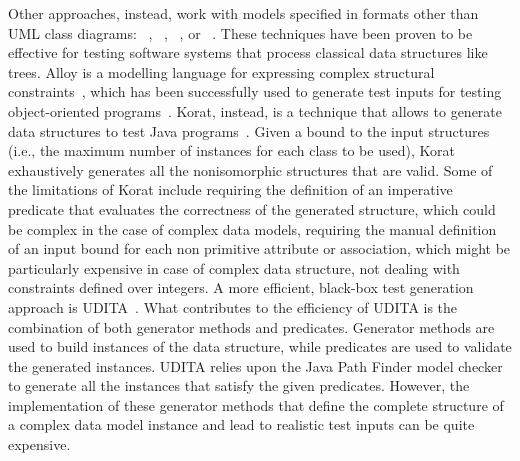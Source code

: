 Other approaches, instead, work with models specified in formats other than UML class diagrams:
~\cite{Boyapati-KORAT-ISSTA-2002,gligoric2010test}, ~\cite{Senni-CPLgeneration-TAP-2012}, ~\cite{Khurshid-SpecificationBasedTesting-ASE-2004}, or ~\cite{Horcher-Z-1995}.
These techniques have been proven to be effective for testing software systems that process classical data structures like trees. 
Alloy is a modelling language for expressing complex structural constraints~\cite{Jackson:Alloy:2002},
which has been successfully used to generate test inputs for testing object-oriented programs~\cite{Khurshid-SpecificationBasedTesting-ASE-2004}.
Korat, instead, is a technique that allows to generate data structures to test Java programs~\cite{Boyapati-KORAT-ISSTA-2002}. Given a bound to the input structures (i.e., the maximum number of instances for each class to be used), Korat exhaustively generates all the nonisomorphic structures that are valid. 
Some of the limitations of Korat include requiring the definition of an imperative predicate that evaluates the correctness of the generated structure, which could be complex in the case of complex data models, requiring the manual definition of an input bound for each non primitive attribute or association, which might be particularly expensive in case of complex data structure,  not dealing with constraints defined over integers.
A more efficient, black-box test generation approach is UDITA~\cite{gligoric2010test}.
What contributes to the efficiency of UDITA is the combination of both generator methods and predicates.
Generator methods are used to build instances of the data structure, while predicates are used to validate the generated instances. UDITA relies upon the Java Path Finder model checker~\cite{Visser-JPF-2004} to generate all the instances that satisfy the given predicates. However, the implementation of these generator methods that define the complete structure of a complex data model instance and lead to realistic test inputs can be quite expensive. 

